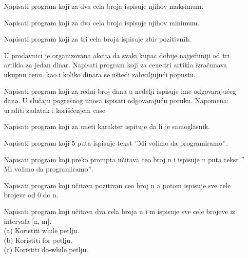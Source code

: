 \begin{primer}
Napisati program koji za dva cela broja ispisuje
njihov maksimum.
\end{primer}

\begin{primer}
Napisati program koji za dva cela broja ispisuje
njihov minimum.
\end{primer}

\begin{primer}
Napisati program koji za tri cela broja ispisuje zbir
pozitivnih.
\end{primer}

\begin{primer}
U prodavnici je organizovana akcija da svaki kupac dobije
najjeftiniji od tri artikla za jedan dinar. Napisati program koji za cene
tri artikla izračunava ukupnu cenu, kao i koliko dinara se uštedi zahvaljujući
popustu.
\end{primer}


\begin{primer}
Napisati program koji za redni broj dana u nedelji ispisuje
ime odgovarajućeg dana. U slučaju pogrešnog unosa ispisati odgovarajuću
poruku. Napomena: uraditi zadatak i korišćenjem case
\end{primer}

\begin{primer}
Napisati program koji za uneti karakter ispituje da li je
samoglasnik.
\end{primer}

\begin{primer}
Napisati program koji 5 puta ispisuje tekst $"$Mi volimo da
programiramo$"$.
\end{primer}

\begin{primer}
Napisati program koji preko prompta učitava ceo broj n i ispisuje n puta
tekst $"$Mi volimo da
programiramo$"$.
\end{primer}

\begin{primer}
Napisati program koji učitava pozitivan ceo broj n a potom
ispisuje sve cele brojeve od 0 do n.
\end{primer}

\begin{primer}
Napisati program koji učitava dva cela broja n i m ispisuje
sve cele brojeve iz intervala [n, m].\\
(a) Koristiti while petlju.\\
(b) Koristiti for petlju.\\
(c) Koristiti do-while petlju.\\
\end{primer}

